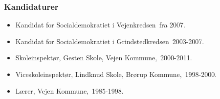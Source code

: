 \documentclass[11pt, a4paper]{awesome-cv}
\begin{document}
\begin{cvletter}
\subsubsection*{Kandidaturer}
\begin{itemize}
\item Kandidat for Socialdemokratiet i Vejenkredsen fra 2007.
\item Kandidat for Socialdemokratiet i Grindstedkredsen 2003-2007.
\end{itemize}
\begin{itemize}
\item Skoleinspektør, Gesten Skole, Vejen Kommune, 2000-2011.
\item Viceskoleinspektør, Lindknud Skole, Brørup Kommune, 1998-2000.
\item Lærer, Vejen Kommune, 1985-1998.
\end{itemize}
\end{cvletter}
\end{document}
